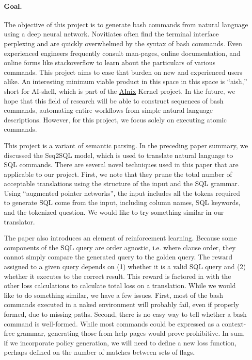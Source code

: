 \paragraph{Goal.}
The objective of this project is to generate bash commands from natural
language using a deep neural network. Novitiates often find the terminal
interface perplexing and are quickly overwhelmed by the syntax of bash
commands. Even experienced engineers frequently consult man-pages, online
documentation, and online forms like stackoverflow to learn about the
particulars of various commands. This project aims to ease that burden on new
and experienced users alike. An interesting minimum viable product in this
space in this space is ``aish,'' short for AI-shell, which is part of the
\href{http://anix.org}{AInix} Kernel project. In the future, we hope that this
field of research will be able to construct sequences of bash commands,
automating entire workflows from simple natural language descriptions. However,
for this project, we focus solely on executing atomic commands.
\par
This project is a variant of semantic parsing. In the preceding paper summary,
we discussed the Seq2SQL model, which is used to translate natural language to
SQL commands. There are several novel techniques used in this paper that are
applicable to our project. First, we note that they prune the total number of
acceptable translations using the structure of the input and the SQL grammar.
Using ``augmented pointer networks'', the input includes all the tokens
required to generate SQL come from the input, including column names, SQL
keywords, and the tokenized question. We would like to try something similar in
our translator.
\par
The paper also introduces an element of reinforcement learning. Because some
components of the SQL query are order agnostic, i.e. where clause order, they
cannot simply compare the generated query to the golden query. The reward
assigned to a given query depends on (1) whether it is a valid SQL query and
(2) whether it executes to the correct result. This reward is factored in with
the other loss calculations to calculate total loss on a translation. While we
would like to do something similar, we have a few issues. First, most of the
bash commands executed in a naked environment will probably fail, even if
properly formed, due to missing paths. Second, there is no easy way to tell
whether a bash command is well-formed. While most commands could be expressed
as a context-free grammar, generating those from help pages would prove
prohibitive. In sum, if we incorporate policy generation, we will need to
define a new loss function, perhaps defined on the number of matches between
sets of flags.

